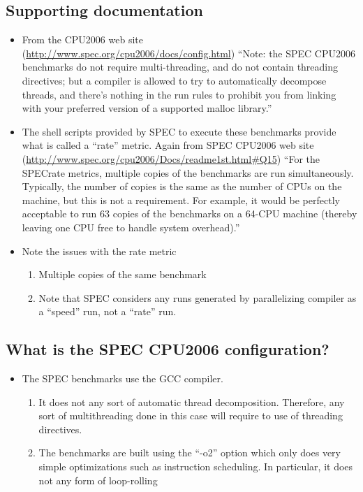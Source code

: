 \documentclass[11pt]{article}
\begin{document}
\subsection{Supporting documentation}
\label{sec-2-1}

\begin{itemize}
\item From the CPU2006 web site
    (\href{http://www.spec.org/cpu2006/docs/config.html}{http://www.spec.org/cpu2006/docs/config.html})
    ``Note: the SPEC CPU2006 benchmarks do not require multi-threading,
    and do not contain threading directives; but a compiler is allowed
    to try to automatically decompose threads, and there's nothing in
    the run rules to prohibit you from linking with your preferred
    version of a supported malloc library.''
\item The shell scripts provided by SPEC to execute these benchmarks
    provide what is called a ``rate'' metric.   Again from SPEC CPU2006
    web site (\href{http://www.spec.org/cpu2006/Docs/readme1st.html#Q15}{http://www.spec.org/cpu2006/Docs/readme1st.html\#Q15})
    ``For the SPECrate metrics, multiple copies of the benchmarks are run
    simultaneously.  Typically, the number of copies is the same as the
    number of CPUs on the machine, but this is not a requirement.  For
    example, it would be perfectly acceptable to run 63 copies of the
    benchmarks on a 64-CPU machine (thereby leaving one CPU free to
    handle system overhead).''
\item Note the issues with the rate metric
\begin{enumerate}
\item Multiple copies of the same benchmark
\item Note that SPEC considers any runs generated by parallelizing
       compiler as a ``speed'' run, not a ``rate'' run.
\end{enumerate}
\end{itemize}
\subsection{What is the SPEC CPU2006 configuration?}
\label{sec-2-2}

\begin{itemize}
\item The SPEC benchmarks use the GCC compiler.
\begin{enumerate}
\item It does not any sort of automatic thread
        decomposition. Therefore, any sort of multithreading done in
        this case will require to use of threading directives.
\item The benchmarks are built using the ``-o2'' option which only does
        very simple optimizations such as instruction scheduling.  In
        particular, it does not any form of loop-rolling
\end{enumerate}
\end{itemize}
\end{document}
